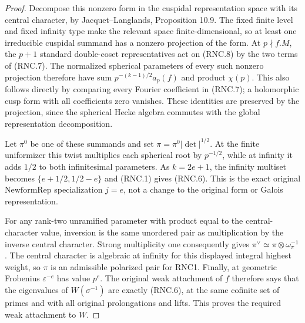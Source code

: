 \documentclass[11pt,a4paper]{article}
\numberwithin{equation}{section}
\theoremstyle{remark}\newtheorem{remark}[theorem]{Remark}
\begin{document}
\begin{proof}
Decompose this nonzero form in the cuspidal representation space
with its central character, by Jacquet--Langlands,
Proposition 10.9.  The fixed finite level and fixed infinity
type make the relevant space finite-dimensional, so at least
one irreducible cuspidal summand has a nonzero projection of
the form.  At $p\nmid f.M$, the $p+1$ standard double-coset
representatives act on (RNC.8) by the two terms of (RNC.7).
The normalized spherical parameters of every such nonzero
projection therefore have sum $p^{-(k-1)/2}a_p(f)$ and product
$\chi(p)$.  This also follows directly by comparing every
Fourier coefficient in (RNC.7); a holomorphic cusp form with
all coefficients zero vanishes.  These identities are preserved
by the projection, since the spherical Hecke algebra commutes
with the global representation decomposition.

Let $\pi^0$ be one of these summands and set
$\pi=\pi^0|\det|^{1/2}$.  At the finite uniformizer this twist
multiplies each spherical root by $p^{-1/2}$, while at infinity
it adds $1/2$ to both infinitesimal parameters.  As $k=2e+1$,
the infinity multiset becomes $\{e+1/2,1/2-e\}$ and (RNC.1)
gives (RNC.6).  This is the exact original
$\mathrm{NewformRep}$ specialization $j=e$, not a change to
the original form or Galois representation.

For any rank-two unramified parameter with product equal to
the central-character value, inversion is the same unordered
pair as multiplication by the inverse central character.
Strong multiplicity one consequently gives
$\pi^\vee\simeq\pi\otimes\omega_\pi^{-1}$.
The central character is algebraic at infinity for this
displayed integral highest weight, so $\pi$ is an admissible
polarized pair for RNC1.  Finally, at geometric Frobenius
$\varepsilon^{-e}$ has value $p^e$.  The original weak
attachment of $f$ therefore says that the eigenvalues of
$W(\sigma^{-1})$ are exactly (RNC.6), at the same cofinite
set of primes and with all original prolongations and lifts.
This proves the required weak attachment to $W$.
\end{proof}

\end{document}
